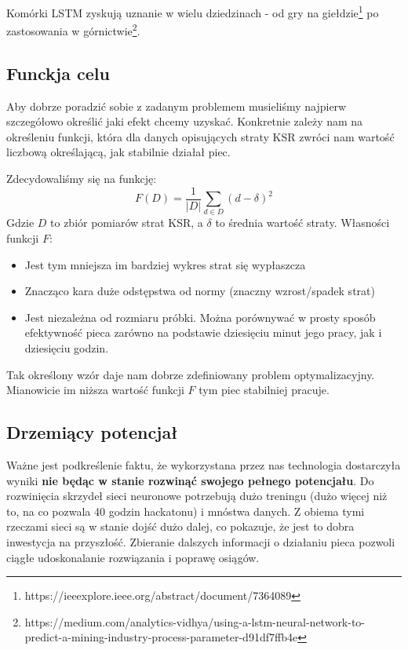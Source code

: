 \documentclass[11pt]{article}
\begin{document}
Komórki LSTM zyskują uznanie w wielu dziedzinach - od gry na giełdzie\footnote{https://ieeexplore.ieee.org/abstract/document/7364089} po zastosowania w górnictwie\footnote{https://medium.com/analytics-vidhya/using-a-lstm-neural-network-to-predict-a-mining-industry-process-parameter-d91df7ffb4e}.

\subsection{Funckja celu}
Aby dobrze poradzić sobie z zadanym problemem musieliśmy najpierw szczegółowo określić jaki efekt chcemy uzyskać. Konkretnie zależy nam na określeniu funkcji, która dla danych opisujących straty KSR zwróci nam wartość liczbową określającą, jak stabilnie działał piec.

Zdecydowaliśmy się na funkcję:
$$F(D)=\frac{1}{|D|}\sum_{d\in D}(d-\delta)^2$$
Gdzie $D$ to zbiór pomiarów strat KSR, a $\delta$ to średnia wartość straty. Własności funkcji $F$:
\begin{itemize}
\item Jest tym mniejsza im bardziej wykres strat się wypłaszcza
\item Znacząco kara duże odstępstwa od normy (znaczny wzrost/spadek strat)
\item Jest niezależna od rozmiaru próbki. Można porównywać w prosty sposób efektywność pieca zarówno na podstawie dziesięciu minut jego pracy, jak i dziesięciu godzin.
\end{itemize}

Tak określony wzór daje nam dobrze zdefiniowany problem optymalizacyjny. Mianowicie im niższa wartość funkcji $F$ tym piec stabilniej pracuje.

\subsection{Drzemiący potencjał}

Ważne jest podkreślenie faktu, że wykorzystana przez nas technologia dostarczyła wyniki \textbf{nie będąc w stanie rozwinąć swojego pełnego potencjału}. Do rozwinięcia skrzydeł sieci neuronowe potrzebują dużo treningu (dużo więcej niż to, na co pozwala 40 godzin hackatonu) i mnóstwa danych. Z obiema tymi rzeczami sieci są w stanie dojść dużo dalej, co pokazuje, że jest to dobra inwestycja na przyszłość. Zbieranie dalszych informacji o działaniu pieca pozwoli ciągłe udoskonalanie rozwiązania i poprawę osiągów.\\
\end{document}
